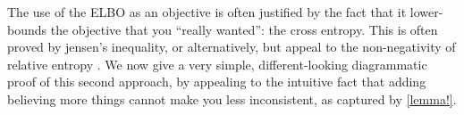 \documentclass{article}
\makeatletter
\theoremstyle{plain}
\newtheorem{prop}[theorem]{Proposition}
\theoremstyle{definition}
\let\H\relax
\DeclareMathOperator{\H}{\mathrm{H}} %
\DeclareMathOperator*{\Ex}{\mathbb{E}} %
\newcommand{\datadist}[1]{\Pr\nolimits_{#1}}
\newcommand\aar{\@ifstar\aar@one@star\aar@plain}
\newcommand\aar@one@star{\@ifstar\aar@resize{\aar@plain*}}
\newcommand\aar@resize[1]{\sbox{\aar@content}{#1}\scaleleftright[3.8ex]
		{\Biggl\langle\!\!\!\!\Biggl\langle}{\usebox{\aar@content}}
		{\Biggr\rangle\!\!\!\!\Biggr\rangle}}
\makeatother
\begin{document}
%
%
%
%
%



The use of the ELBO as an objective is often justified by the fact that it lower-bounds the objective that you ``really wanted'': the cross entropy.
This is often proved by jensen's inequality, or alternatively, but appeal to the non-negativity of relative entropy \cite{elboproofs}.
We now give a very simple, different-looking diagrammatic proof of this second approach, by appealing to the intuitive fact that adding believing more things cannot make you less inconsistent, as captured by \cref{lemma!}.
\end{document}
